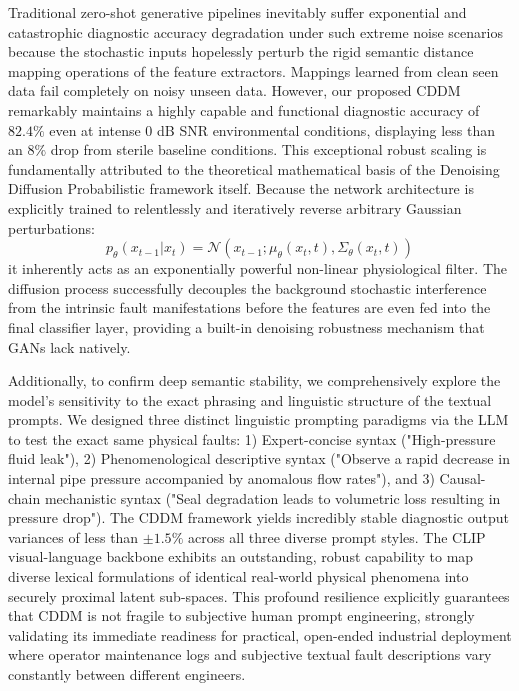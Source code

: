 Traditional zero-shot generative pipelines inevitably suffer exponential and catastrophic diagnostic accuracy degradation under such extreme noise scenarios because the stochastic inputs hopelessly perturb the rigid semantic distance mapping operations of the feature extractors. Mappings learned from clean seen data fail completely on noisy unseen data. However, our proposed CDDM remarkably maintains a highly capable and functional diagnostic accuracy of $82.4\%$ even at intense $0$ dB SNR environmental conditions, displaying less than an $8\%$ drop from sterile baseline conditions. This exceptional robust scaling is fundamentally attributed to the theoretical mathematical basis of the Denoising Diffusion Probabilistic framework itself. Because the network architecture is explicitly trained to relentlessly and iteratively reverse arbitrary Gaussian perturbations:
\begin{equation}
    \label{eq:denoise_step}
    p_\theta(x_{t-1}|x_t) = \mathcal{N}(x_{t-1}; \mu_\theta(x_t, t), \Sigma_\theta(x_t, t))
\end{equation}
it inherently acts as an exponentially powerful non-linear physiological filter. The diffusion process successfully decouples the background stochastic interference from the intrinsic fault manifestations before the features are even fed into the final classifier layer, providing a built-in denoising robustness mechanism that GANs lack natively.

Additionally, to confirm deep semantic stability, we comprehensively explore the model's sensitivity to the exact phrasing and linguistic structure of the textual prompts. We designed three distinct linguistic prompting paradigms via the LLM to test the exact same physical faults: 1) Expert-concise syntax ("High-pressure fluid leak"), 2) Phenomenological descriptive syntax ("Observe a rapid decrease in internal pipe pressure accompanied by anomalous flow rates"), and 3) Causal-chain mechanistic syntax ("Seal degradation leads to volumetric loss resulting in pressure drop"). The CDDM framework yields incredibly stable diagnostic output variances of less than $\pm 1.5\%$ across all three diverse prompt styles. The CLIP visual-language backbone exhibits an outstanding, robust capability to map diverse lexical formulations of identical real-world physical phenomena into securely proximal latent sub-spaces. This profound resilience explicitly guarantees that CDDM is not fragile to subjective human prompt engineering, strongly validating its immediate readiness for practical, open-ended industrial deployment where operator maintenance logs and subjective textual fault descriptions vary constantly between different engineers.

